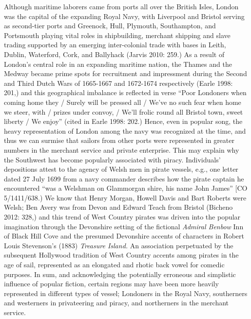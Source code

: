 \begin{styleStandard}
\end{styleStandard}

\begin{styleStandard}
\end{styleStandard}

\begin{styleStandard}
Although maritime laborers came from ports all over the British Isles, London was the capital of the expanding Royal Navy, with Liverpool and Bristol serving as second-tier ports and Greenock, Hull, Plymouth, Southampton, and Portsmouth playing vital roles in shipbuilding, merchant shipping and slave trading supported by an emerging inter-colonial trade with bases in Leith, Dublin, Waterford, Cork, and Ballyhack (Jarvis 2010: 259.) As a result of London’s central role in an expanding maritime nation, the Thames and the Medway became prime spots for recruitment and impressment during the Second and Third Dutch Wars of 1665-1667 and 1672-1674 respectively (Earle 1998: 201,) and this geographical imbalance is reflected in verse “Poor Londoners when coming home they / Surely will be pressed all / We’ve no such fear when home we steer, with / prizes under convoy, / We’ll frolic round all Bristol town, sweet liberty / We enjoy” (cited in Earle 1998: 202.) Hence, even in popular song, the heavy representation of London among the navy was recognized at the time, and thus we can surmise that sailors from other ports were represented in greater numbers in the merchant service and private enterprise. This may explain why the Southwest has become popularly associated with piracy. Individuals’ depositions attest to the agency of Welsh men in pirate vessels, e.g., one letter dated 27 July 1699 from a navy commander describes how the pirate captain he encountered “was a Welshman on Glammorgan shire, his name John James” [CO 5/1411/638.) We know that Henry Morgan, Howell Davis and Bart Roberts were Welsh; Ben Avery was from Devon and Edward Teach from Bristol (Bicheno 2012: 328,) and this trend of West Country pirates was driven into the popular imagination through the Devonshire setting of the fictional \textit{Admiral Benbow} Inn of Black Hill Cove and the presumed Devonshire accents of characters in Robert Louis Stevenson's (1883) \textit{Treasure Island. }An association perpetuated by the subsequent Hollywood tradition of West Country accents among pirates in the age of sail, represented as an elongated and rhotic back vowel for comedic purposes. In sum, and acknowledging the potentially erroneous and simplistic influence of popular fiction, certain regions may have been more heavily represented in different types of vessel; Londoners in the Royal Navy, southerners and westerners in privateering and piracy, and northerners in the merchant service. 
\end{styleStandard}

